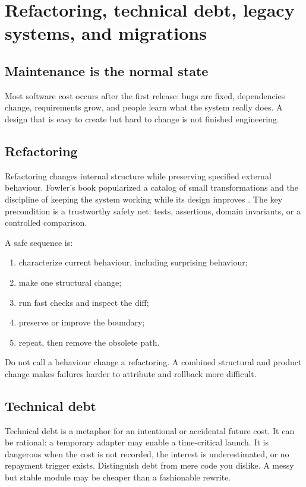 \chapter{Refactoring, technical debt, legacy systems, and migrations}

\section{Maintenance is the normal state}
Most software cost occurs after the first release: bugs are fixed, dependencies
change, requirements grow, and people learn what the system really does. A design
that is easy to create but hard to change is not finished engineering.

\section{Refactoring}
Refactoring changes internal structure while preserving specified external
behaviour. Fowler's book popularized a catalog of small transformations and the
discipline of keeping the system working while its design improves
\cite{fowler2018refactoring}. The key precondition is a trustworthy safety net:
tests, assertions, domain invariants, or a controlled comparison.

A safe sequence is:

\begin{enumerate}
  \item characterize current behaviour, including surprising behaviour;
  \item make one structural change;
  \item run fast checks and inspect the diff;
  \item preserve or improve the boundary;
  \item repeat, then remove the obsolete path.
\end{enumerate}

Do not call a behaviour change a refactoring. A combined structural and product
change makes failures harder to attribute and rollback more difficult.

\section{Technical debt}
Technical debt is a metaphor for an intentional or accidental future cost. It
can be rational: a temporary adapter may enable a time-critical launch. It is
dangerous when the cost is not recorded, the interest is underestimated, or no
repayment trigger exists. Distinguish debt from mere code you dislike. A messy
but stable module may be cheaper than a fashionable rewrite.

